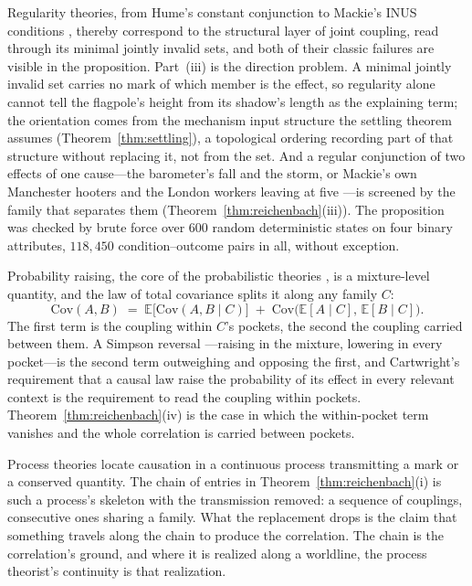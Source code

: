 \documentclass[11pt]{article}
\begin{document}
\noindent Regularity theories, from Hume's constant conjunction to Mackie's INUS conditions \cite{hume1748enquiry, mackie1965causes}, thereby correspond to the structural layer of joint coupling, read through its minimal jointly invalid sets, and both of their classic failures are visible in the proposition. Part~(iii) is the direction problem. A minimal jointly invalid set carries no mark of which member is the effect, so regularity alone cannot tell the flagpole's height from its shadow's length as the explaining term; the orientation comes from the mechanism input structure the settling theorem assumes (Theorem~\ref{thm:settling}), a topological ordering recording part of that structure without replacing it, not from the set. And a regular conjunction of two effects of one cause---the barometer's fall and the storm, or Mackie's own Manchester hooters and the London workers leaving at five \cite{mackie1974cement}---is screened by the family that separates them (Theorem~\ref{thm:reichenbach}(iii)). The proposition was checked by brute force over 600 random deterministic states on four binary attributes, $118{,}450$ condition--outcome pairs in all, without exception.

\noindent Probability raising, the core of the probabilistic theories \cite{suppes1970probabilistic, eells1991probabilistic}, is a mixture-level quantity, and the law of total covariance splits it along any family $C$:
\begin{equation}
\label{eq:total-covariance}
\mathrm{Cov}(A, B) \;=\; \mathbb{E}\big[\mathrm{Cov}(A, B \mid C)\big] \;+\; \mathrm{Cov}\big(\mathbb{E}[A \mid C],\, \mathbb{E}[B \mid C]\big).
\end{equation}
The first term is the coupling within $C$'s pockets, the second the coupling carried between them. A Simpson reversal \cite{simpson1951interpretation}---raising in the mixture, lowering in every pocket---is the second term outweighing and opposing the first, and Cartwright's requirement that a causal law raise the probability of its effect in every relevant context \cite{cartwright1979causal} is the requirement to read the coupling within pockets. Theorem~\ref{thm:reichenbach}(iv) is the case in which the within-pocket term vanishes and the whole correlation is carried between pockets.

\noindent Process theories \cite{salmon1984scientific, dowe2000physical} locate causation in a continuous process transmitting a mark or a conserved quantity. The chain of entries in Theorem~\ref{thm:reichenbach}(i) is such a process's skeleton with the transmission removed: a sequence of couplings, consecutive ones sharing a family. What the replacement drops is the claim that something travels along the chain to produce the correlation. The chain is the correlation's ground, and where it is realized along a worldline, the process theorist's continuity is that realization.
\end{document}
